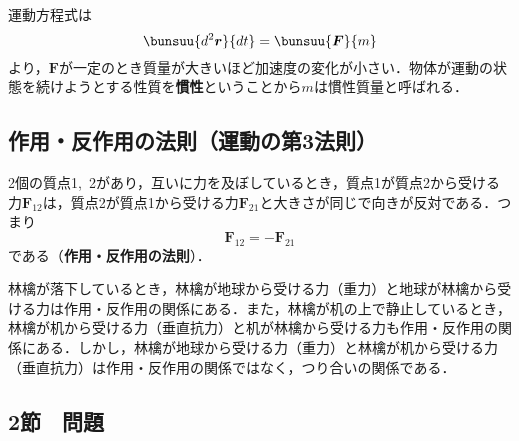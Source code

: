 運動方程式は
\begin{equation*}
	\bunsuu{d^2\bm{r}}{dt} = \bunsuu{\bm{F}}{m}
\end{equation*}
より，$\bm{F}$が一定のとき質量が大きいほど加速度の変化が小さい．物体が運動の状態を続けようとする性質を\textbf{慣性}ということから$m$は慣性質量と呼ばれる．



\subsection{作用・反作用の法則（運動の第3法則）}

\begin{tcolorbox}[colback=white]
	2個の質点1,\ 2があり，互いに力を及ぼしているとき，質点1が質点2から受ける力$\bm{F}_{12}$は，質点2が質点1から受ける力$\bm{F}_{21}$と大きさが同じで向きが反対である．つまり
	\begin{equation}
		\bm{F}_{12} = -\bm{F}_{21}
	\end{equation}
	である（\textbf{作用・反作用の法則}）．
\end{tcolorbox}

林檎が落下しているとき，林檎が地球から受ける力（重力）と地球が林檎から受ける力は作用・反作用の関係にある．また，林檎が机の上で静止しているとき，林檎が机から受ける力（垂直抗力）と机が林檎から受ける力も作用・反作用の関係にある．しかし，林檎が地球から受ける力（重力）と林檎が机から受ける力（垂直抗力）は作用・反作用の関係ではなく，つり合いの関係である．



\subsection{2節　問題}

